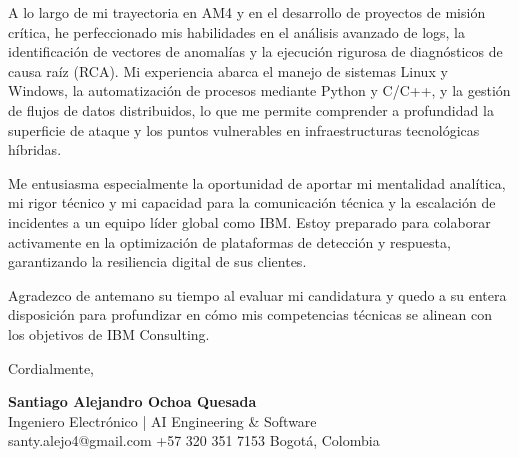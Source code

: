 \documentclass[11pt,a4paper]{article}
\begin{document}
A lo largo de mi trayectoria en AM4 y en el desarrollo de proyectos de misión crítica, he perfeccionado mis habilidades en el análisis avanzado de logs, la identificación de vectores de anomalías y la ejecución rigurosa de diagnósticos de causa raíz (RCA). Mi experiencia abarca el manejo de sistemas Linux y Windows, la automatización de procesos mediante Python y C/C++, y la gestión de flujos de datos distribuidos, lo que me permite comprender a profundidad la superficie de ataque y los puntos vulnerables en infraestructuras tecnológicas híbridas.

Me entusiasma especialmente la oportunidad de aportar mi mentalidad analítica, mi rigor técnico y mi capacidad para la comunicación técnica y la escalación de incidentes a un equipo líder global como IBM. Estoy preparado para colaborar activamente en la optimización de plataformas de detección y respuesta, garantizando la resiliencia digital de sus clientes.

Agradezco de antemano su tiempo al evaluar mi candidatura y quedo a su entera disposición para profundizar en cómo mis competencias técnicas se alinean con los objetivos de IBM Consulting.

\vspace{10pt}
\noindent Cordialmente,

\vspace{12pt}
\noindent
\textbf{\large\color{accent} Santiago Alejandro Ochoa Quesada}\\
{\small\color{subtletext} Ingeniero Electrónico | AI Engineering \& Software}\\
{\footnotesize\color{subtletext} santy.alejo4@gmail.com \;\textbar\; +57 320 351 7153 \;\textbar\; Bogotá, Colombia}
\end{document}
